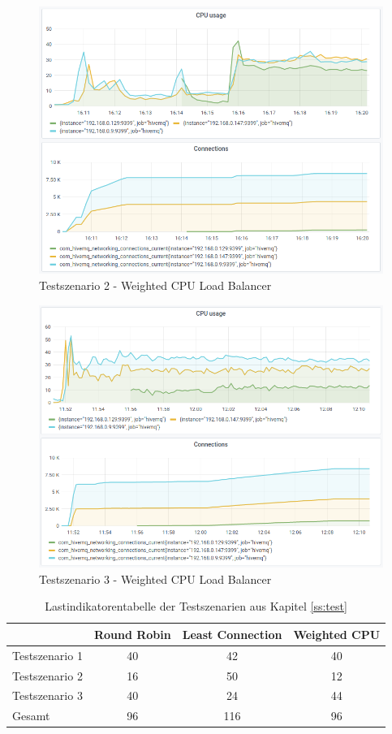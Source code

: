 \begin{figure}
    \centering
    \includegraphics[scale=0.8]{images/s2_cpu.png}
    \caption{Testszenario 2 - Weighted CPU Load Balancer}
    \label{fig:s2-cpu}
\end{figure}
\begin{figure}
    \centering
    \includegraphics[scale=0.8]{images/s3_cpu.png}
    \caption{Testszenario 3 - Weighted CPU Load Balancer}
    \label{fig:s3-cpu}
\end{figure}

\begin{table}[h!]
\centering
\renewcommand{\arraystretch}{1.5}
\begin{tabular}{|l|c|c|c|}
    \hline
    & Round Robin & Least Connection & Weighted CPU \\
    \hline
    Testszenario 1 & 40 & 42 & 40 \\
    \hline
    Testszenario 2 & 16 & 50 & 12 \\
    \hline
    Testszenario 3 & 40 & 24 & 44 \\
    \hline
    \hline
    Gesamt & 96 & 116 & 96 \\
    \hline
\end{tabular}
\caption{Lastindikatorentabelle der Testszenarien aus Kapitel \ref{ss:test}}
\label{table:test-output}
\end{table}

